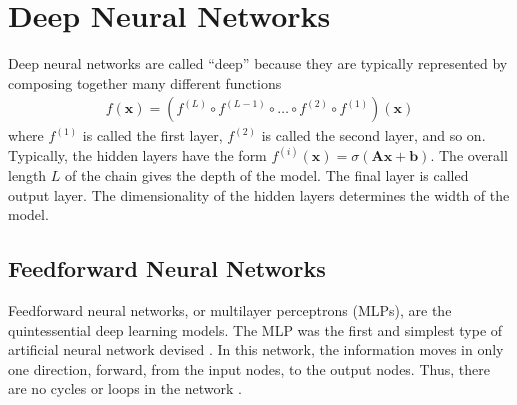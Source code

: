 \documentclass{scrartcl}
\begin{document}



\newpage


\section{Deep Neural Networks}
\label{sec:dnn}

Deep neural networks are called ``deep'' because they are typically represented by composing together many different functions
\begin{align}
f(\mathbf x) = (f^{(L)} \circ f^{(L-1)} \circ \dots \circ f^{(2)} \circ f^{(1)})(\mathbf x)
\end{align} 
where $f^{(1)}$ is called the first layer, $f^{(2)}$ is called the second layer, and so on. Typically, the hidden layers have the form $f^{(i)}(\mathbf x) = \sigma(\mathbf A\mathbf x + \mathbf b)$. The overall length $L$ of the chain gives the depth of the model. The final layer is called output layer. The dimensionality of the hidden layers determines the width of the model. 

\subsection{Feedforward Neural Networks}

Feedforward neural networks, or multilayer perceptrons (MLPs), are the quintessential deep learning models. The MLP was the first and simplest type of artificial neural network devised \cite{Schmidhuber2015}. In this network, the information moves in only one direction, forward, from the input nodes, to the output nodes. Thus, there are no cycles or loops in the network \cite{Zell1994}.
\end{document}

